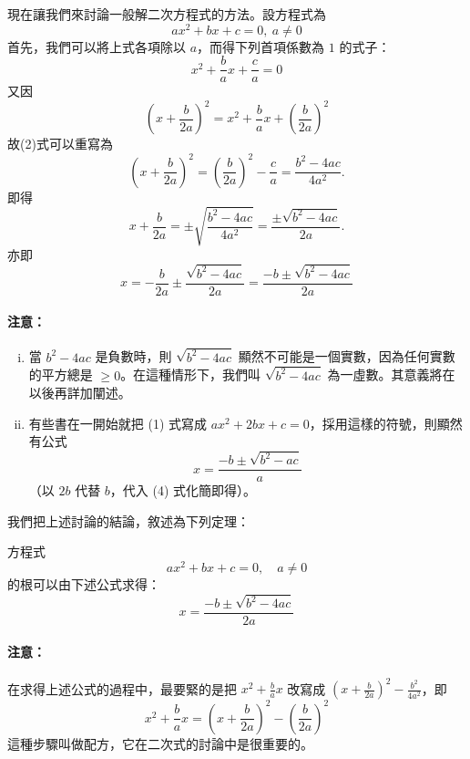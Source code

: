 現在讓我們來討論一般解二次方程式的方法。設方程式為
\begin{equation}\label{eq:b2_quad_standard}\tag{1}
ax^2+bx+c=0,\ a \ne 0
\end{equation}
首先，我們可以將上式各項除以 $a$，而得下列首項係數為 $1$ 的式子：
\begin{equation}\label{eq:b2_quad_div_a}\tag{2}
x^2+\frac{b}{a}x+\frac{c}{a}=0
\end{equation}
又因
\begin{equation}\label{eq:b2_complete_square_id}\tag{3}
\left(x+\frac{b}{2a}\right)^2=x^2+\frac{b}{a}x+\left(\frac{b}{2a}\right)^2
\end{equation}
故(2)式可以重寫為
\[
\left(x+\frac{b}{2a}\right)^2 = \left(\frac{b}{2a}\right)^2 - \frac{c}{a} = \frac{b^2-4ac}{4a^2}.
\]
即得
\[
x+\frac{b}{2a} = \pm \sqrt{\frac{b^2-4ac}{4a^2}} = \frac{\pm \sqrt{b^2-4ac}}{2a}.
\]
亦即
\begin{equation}\label{eq:b2_quad_sol}\tag{4}
x = -\frac{b}{2a} \pm \frac{\sqrt{b^2-4ac}}{2a} = \frac{-b \pm \sqrt{b^2-4ac}}{2a}
\end{equation}

\paragraph{注意：}
\begin{enumerate}[(i)]
  \item 當 $b^2-4ac$ 是負數時，則 $\sqrt{b^2-4ac}$ 顯然不可能是一個實數，因為任何實數的平方總是 $\ge 0$。在這種情形下，我們叫 $\sqrt{b^2-4ac}$ 為一虛數。其意義將在以後再詳加闡述。
  \item 有些書在一開始就把 (1) 式寫成 $ax^2+2bx+c=0$，採用這樣的符號，則顯然有公式
  \[
  x = \frac{-b \pm \sqrt{b^2-ac}}{a}
  \]
  （以 $2b$ 代替 $b$，代入 (4) 式化簡即得）。
\end{enumerate}

我們把上述討論的結論，敘述為下列定理：

\begin{theorem}\label{thm:b2_1-1}
方程式
\[
ax^2+bx+c=0,\quad a \ne 0
\]
的根可以由下述公式求得：
\begin{equation}\label{eq:b2_quad_formula_thm}\tag{4}
x = \frac{-b \pm \sqrt{b^2-4ac}}{2a}
\end{equation}
\end{theorem}

\paragraph{注意：} 在求得上述公式的過程中，最要緊的是把 $x^2+\frac{b}{a}x$ 改寫成 $(x+\frac{b}{2a})^2 - \frac{b^2}{4a^2}$，即
\begin{equation}\label{eq:b2_completing_square_thm}\tag{5}
x^2+\frac{b}{a}x = \left(x+\frac{b}{2a}\right)^2 - \left(\frac{b}{2a}\right)^2
\end{equation}
這種步驟叫做配方，它在二次式的討論中是很重要的。

